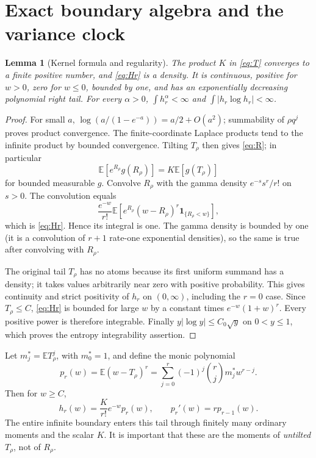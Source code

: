 \documentclass[11pt,oneside]{article}
\numberwithin{equation}{section}
\theoremstyle{plain}
\newtheorem{lemma}[theorem]{Lemma}
\theoremstyle{definition}
\theoremstyle{remark}
\newcommand{\E}{\mathbb E}
\newcommand{\ind}{\mathbf 1}
\begin{document}
\section{Exact boundary algebra and the variance clock}
\label{sec:kernel}
\begin{lemma}[Kernel formula and regularity]\label{lem:kernel}
The product $K$ in \eqref{eq:T} converges to a finite positive number,
and \eqref{eq:Hr} is a density. It is continuous, positive for $w>0$,
zero for $w\le0$, bounded by one, and has an exponentially decreasing
polynomial right tail. For every $\alpha>0$,
$\int h_r^\alpha<\infty$ and $\int|h_r\log h_r|<\infty$.
\end{lemma}
\begin{proof}
For small $a$, $\log(a/(1-e^{-a}))=a/2+O(a^2)$; summability of
$\rho q^j$ proves product convergence. The finite-coordinate Laplace
products tend to the infinite product by bounded convergence. Tilting
$T_\rho$ then gives \eqref{eq:R}; in particular
\[
 \E[e^{R_\rho}g(R_\rho)]=K\E[g(T_\rho)]
\]
for bounded measurable $g$. Convolve $R_\rho$ with the gamma density
$e^{-s}s^r/r!$ on $s>0$. The convolution equals
\[
 \frac{e^{-w}}{r!}\E\!\left[e^{R_\rho}(w-R_\rho)^r
                         \ind_{\{R_\rho<w\}}\right],
\]
which is \eqref{eq:Hr}. Hence its integral is one. The gamma density
is bounded by one (it is a convolution of $r+1$ rate-one exponential
densities), so the same is true after convolving with $R_\rho$.

The original tail $T_\rho$ has no atoms because its first uniform
summand has a density; it takes values arbitrarily near zero with
positive probability. This gives continuity and strict positivity of
$h_r$ on $(0,\infty)$, including the $r=0$ case. Since $T_\rho\le C$,
\eqref{eq:Hr} is bounded for large $w$ by a constant times
$e^{-w}(1+w)^r$. Every positive power is therefore integrable. Finally
$y|\log y|\le C_0\sqrt y$ on $0<y\le1$, which proves the entropy
integrability assertion.
\end{proof}

Let $m_j^*=\E T_\rho^j$, with $m_0^*=1$, and define the monic polynomial
\begin{equation}\label{eq:polynomial}
 p_r(w)=\E(w-T_\rho)^r
       =\sum_{j=0}^r(-1)^j\binom rj m_j^*w^{r-j}.
\end{equation}
Then for $w\ge C$,
\begin{equation}\label{eq:tailpoly}
 h_r(w)=\frac K{r!}e^{-w}p_r(w),\qquad
 p_r'(w)=r p_{r-1}(w).
\end{equation}
The entire infinite boundary enters this tail through finitely many
ordinary moments and the scalar $K$. It is important that these are the
moments of \emph{untilted} $T_\rho$, not of $R_\rho$.
\end{document}
